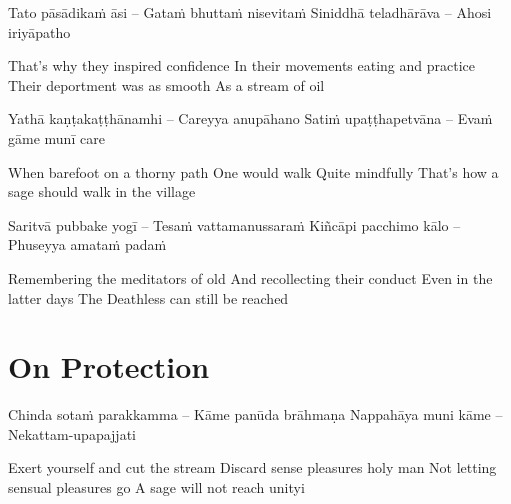\begin{twochants}
Tato pāsādikaṁ āsi – Gataṁ bhuttaṁ nisevitaṁ
Siniddhā teladhārāva – Ahosi iriyāpatho
\end{twochants}

\begin{english}
That’s why they inspired confidence
In their movements eating and practice
Their deportment was as smooth
As a stream of oil
\end{english}

\begin{twochants}
Yathā kaṇṭakaṭṭhānamhi – Careyya anupāhano
Satiṁ upaṭṭhapetvāna – Evaṁ gāme munī care
\end{twochants}

\begin{english}
When barefoot on a thorny path
One would walk
Quite mindfully
That’s how a sage should walk in the village
\end{english}

\begin{twochants}
Saritvā pubbake yogī – Tesaṁ vattamanussaraṁ
Kiñcāpi pacchimo kālo – Phuseyya amataṁ padaṁ
\end{twochants}

\begin{english}
Remembering the meditators of old
And recollecting their conduct
Even in the latter days
The Deathless can still be reached
\end{english}


\clearpage

\section{On Protection}

\begin{leader}
\end{leader}

\begin{twochants}
Chinda sotaṁ parakkamma – Kāme panūda brāhmaṇa
Nappahāya muni kāme – Nekattam-upapajjati
\end{twochants}

\begin{english}
Exert yourself and cut the stream
Discard sense pleasures holy man
Not letting sensual pleasures go
A sage will not reach unityi
\end{english}

